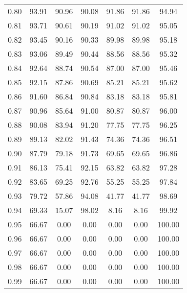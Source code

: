 \begin{tabular}{|c|c|c|c|c|c|c|}
      0.80 &     93.91 &     90.96 &      90.08 &   91.86 &      91.86 &         94.94 \\
      0.81 &     93.71 &     90.61 &      90.19 &   91.02 &      91.02 &         95.05 \\
      0.82 &     93.45 &     90.16 &      90.33 &   89.98 &      89.98 &         95.18 \\
      0.83 &     93.06 &     89.49 &      90.44 &   88.56 &      88.56 &         95.32 \\
      0.84 &     92.64 &     88.74 &      90.54 &   87.00 &      87.00 &         95.46 \\
      0.85 &     92.15 &     87.86 &      90.69 &   85.21 &      85.21 &         95.62 \\
      0.86 &     91.60 &     86.84 &      90.84 &   83.18 &      83.18 &         95.81 \\
      0.87 &     90.96 &     85.64 &      91.00 &   80.87 &      80.87 &         96.00 \\
      0.88 &     90.08 &     83.94 &      91.20 &   77.75 &      77.75 &         96.25 \\
      0.89 &     89.13 &     82.02 &      91.43 &   74.36 &      74.36 &         96.51 \\
      0.90 &     87.79 &     79.18 &      91.73 &   69.65 &      69.65 &         96.86 \\
      0.91 &     86.13 &     75.41 &      92.15 &   63.82 &      63.82 &         97.28 \\
      0.92 &     83.65 &     69.25 &      92.76 &   55.25 &      55.25 &         97.84 \\
      0.93 &     79.72 &     57.86 &      94.08 &   41.77 &      41.77 &         98.69 \\
      0.94 &     69.33 &     15.07 &      98.02 &    8.16 &       8.16 &         99.92 \\
      0.95 &     66.67 &      0.00 &       0.00 &    0.00 &       0.00 &        100.00 \\
      0.96 &     66.67 &      0.00 &       0.00 &    0.00 &       0.00 &        100.00 \\
      0.97 &     66.67 &      0.00 &       0.00 &    0.00 &       0.00 &        100.00 \\
      0.98 &     66.67 &      0.00 &       0.00 &    0.00 &       0.00 &        100.00 \\
      0.99 &     66.67 &      0.00 &       0.00 &    0.00 &       0.00 &        100.00 \\
\bottomrule
\end{tabular}
